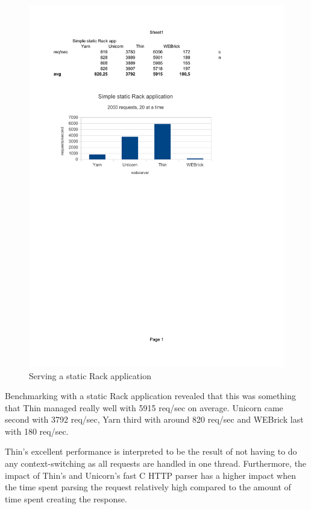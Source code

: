 \begin{figure}[htb]
  \centering
  \includegraphics[width=1.0\textwidth]{benchmark/static.pdf}
  \caption{Serving a static Rack application}
  \label{staticbench}
\end{figure}

Benchmarking with a static Rack application revealed that this was something
that Thin managed really well with 5915 req/sec on average.  Unicorn came
second with 3792 req/sec, Yarn third with around 820 req/sec and
WEBrick last with 180 req/sec. 

Thin's excellent performance is interpreted to be the result of not having to
do any context-switching as all requests are handled in one thread.
Furthermore, the impact of Thin's and Unicorn's fast C HTTP parser has a
higher impact when the time spent parsing the request relatively high compared
to the amount of time spent creating the response.

